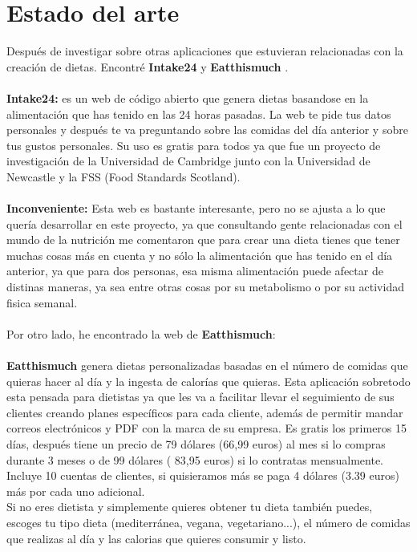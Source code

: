\chapter{Estado del arte}

Después de investigar sobre otras aplicaciones que estuvieran relacionadas con la creación de dietas. Encontré \textbf{Intake24} \cite{Intake24} y \textbf{Eatthismuch} \cite{Eatthismuch}. 
\\\\
\textbf{Intake24:} es un web de código abierto que genera dietas basandose en la alimentación que has tenido en las 24 horas pasadas.
La web te pide tus datos personales y después te va preguntando sobre las comidas del día anterior y sobre tus gustos personales.
Su uso es gratis para todos ya que fue un proyecto de investigación de la Universidad de Cambridge junto con la Universidad de Newcastle y 
la FSS (Food Standards Scotland).
\\\\
\textbf{Inconveniente:}
Esta web es bastante interesante, pero no se ajusta a lo que quería desarrollar en este proyecto, ya que consultando gente relacionadas
con el mundo de la nutrición me comentaron que para crear una dieta tienes que tener muchas cosas más en cuenta y no sólo
la alimentación que has tenido en el día anterior, ya que para dos personas, esa misma alimentación puede afectar de distinas maneras,
ya sea entre otras cosas por su metabolismo o por su actividad fisica semanal.
\\\\
Por otro lado, he encontrado la web de \textbf{Eatthismuch}:
\\\\
\textbf{Eatthismuch} genera dietas personalizadas basadas en el número de comidas que quieras hacer al día y la ingesta de calorías que quieras.
Esta aplicación sobretodo esta pensada para dietistas ya que les va a facilitar llevar el seguimiento de sus clientes creando planes específicos
para cada cliente, además de permitir mandar correos electrónicos y PDF con la marca de su empresa.
Es gratis los primeros 15 días, después tiene un precio de 79 dólares (66,99 euros) al mes si lo compras durante 3 meses o de 99 dólares ( 83,95 euros) si lo contratas mensualmente.
Incluye 10 cuentas de clientes, si quisieramos más se paga 4 dólares (3.39 euros) más por cada uno adicional.\\
Si no eres dietista y simplemente quieres obtener tu dieta también puedes, escoges tu tipo dieta (mediterránea, vegana, vegetariano...), el número de comidas que realizas al día y las calorias que quieres consumir y listo.
